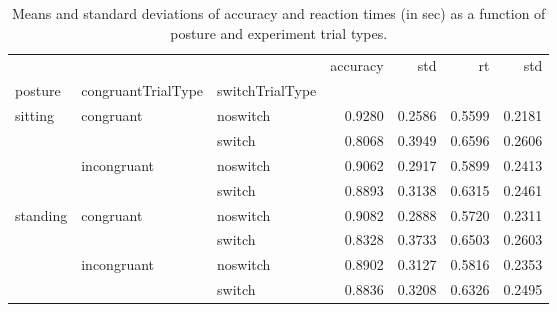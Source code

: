 \begin{table}
\centering
\caption{Means and standard deviations of accuracy and reaction times (in sec) as a function of posture and experiment trial types.}
\label{table-task-switching-replication-reaction-time}
\begin{tabular}{lllrrrr}
\toprule
         &             &        & accuracy &    std &     rt &    std \\
posture & congruantTrialType & switchTrialType &          &        &        &        \\
\midrule
sitting & congruant & noswitch &   0.9280 & 0.2586 & 0.5599 & 0.2181 \\
         &             & switch &   0.8068 & 0.3949 & 0.6596 & 0.2606 \\
         & incongruant & noswitch &   0.9062 & 0.2917 & 0.5899 & 0.2413 \\
         &             & switch &   0.8893 & 0.3138 & 0.6315 & 0.2461 \\
standing & congruant & noswitch &   0.9082 & 0.2888 & 0.5720 & 0.2311 \\
         &             & switch &   0.8328 & 0.3733 & 0.6503 & 0.2603 \\
         & incongruant & noswitch &   0.8902 & 0.3127 & 0.5816 & 0.2353 \\
         &             & switch &   0.8836 & 0.3208 & 0.6326 & 0.2495 \\
\bottomrule
\end{tabular}
\end{table}

